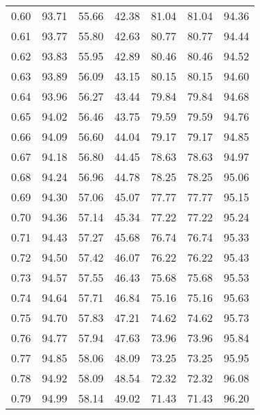 \begin{tabular}{|c|c|c|c|c|c|c|}
      0.60 &     93.71 &     55.66 &      42.38 &   81.04 &      81.04 &         94.36 \\
      0.61 &     93.77 &     55.80 &      42.63 &   80.77 &      80.77 &         94.44 \\
      0.62 &     93.83 &     55.95 &      42.89 &   80.46 &      80.46 &         94.52 \\
      0.63 &     93.89 &     56.09 &      43.15 &   80.15 &      80.15 &         94.60 \\
      0.64 &     93.96 &     56.27 &      43.44 &   79.84 &      79.84 &         94.68 \\
      0.65 &     94.02 &     56.46 &      43.75 &   79.59 &      79.59 &         94.76 \\
      0.66 &     94.09 &     56.60 &      44.04 &   79.17 &      79.17 &         94.85 \\
      0.67 &     94.18 &     56.80 &      44.45 &   78.63 &      78.63 &         94.97 \\
      0.68 &     94.24 &     56.96 &      44.78 &   78.25 &      78.25 &         95.06 \\
      0.69 &     94.30 &     57.06 &      45.07 &   77.77 &      77.77 &         95.15 \\
      0.70 &     94.36 &     57.14 &      45.34 &   77.22 &      77.22 &         95.24 \\
      0.71 &     94.43 &     57.27 &      45.68 &   76.74 &      76.74 &         95.33 \\
      0.72 &     94.50 &     57.42 &      46.07 &   76.22 &      76.22 &         95.43 \\
      0.73 &     94.57 &     57.55 &      46.43 &   75.68 &      75.68 &         95.53 \\
      0.74 &     94.64 &     57.71 &      46.84 &   75.16 &      75.16 &         95.63 \\
      0.75 &     94.70 &     57.83 &      47.21 &   74.62 &      74.62 &         95.73 \\
      0.76 &     94.77 &     57.94 &      47.63 &   73.96 &      73.96 &         95.84 \\
      0.77 &     94.85 &     58.06 &      48.09 &   73.25 &      73.25 &         95.95 \\
      0.78 &     94.92 &     58.09 &      48.54 &   72.32 &      72.32 &         96.08 \\
      0.79 &     94.99 &     58.14 &      49.02 &   71.43 &      71.43 &         96.20 \\

\end{tabular}

